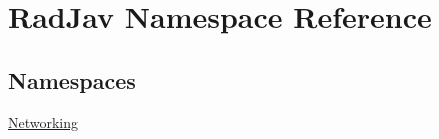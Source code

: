 \hypertarget{namespace_rad_jav}{}\section{Rad\+Jav Namespace Reference}
\label{namespace_rad_jav}
\subsection*{Namespaces}
\begin{DoxyCompactItemize}
\item 
 \hyperlink{namespace_rad_jav_1_1_networking}{Networking}
\end{DoxyCompactItemize}
